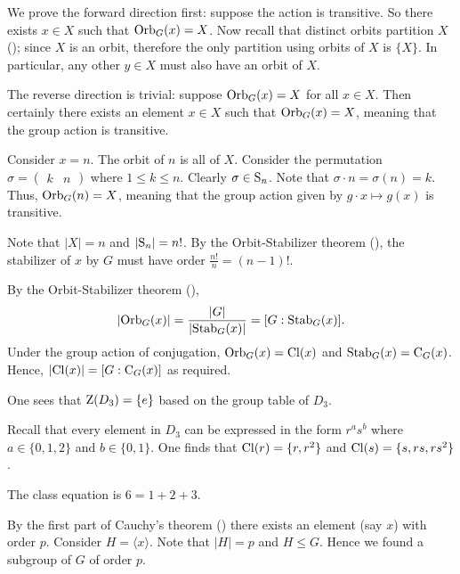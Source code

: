 \begin{questions}
    \item We prove the forward direction first: suppose the action is transitive. So there exists $x \in X$ such that $\mathrm{Orb}_{G}(x) = X$. Now recall that distinct orbits partition $X$ (); since $X$ is an orbit, therefore the only partition using orbits of $X$ is $\{X\}$. In particular, any other $y \in X$ must also have an orbit of $X$.

    The reverse direction is trivial: suppose $\mathrm{Orb}_{G}(x) = X$ for all $x \in X$. Then certainly there exists an element $x \in X$ such that $\mathrm{Orb}_{G}(x) = X$, meaning that the group action is transitive.

    \item \begin{partquestions}{\alph*}
        \item Consider $x = n$. The orbit of $n$ is all of $X$. Consider the permutation $\sigma = \begin{pmatrix}k & n\end{pmatrix}$ where $1 \leq k \leq n$. Clearly $\sigma \in \mathrm{S}_{n}$. Note that $\sigma \cdot n = \sigma(n) = k$. Thus, $\mathrm{Orb}_{G}(n) = X$, meaning that the group action given by $g \cdot x \mapsto g(x)$ is transitive.
        
        \item Note that $|X| = n$ and $|\mathrm{S}_{n}| = n!$. By the Orbit-Stabilizer theorem (), the stabilizer of $x$ by $G$ must have order $\frac{n!}{n} = (n-1)!$.
    \end{partquestions}

    \item By the Orbit-Stabilizer theorem (),
    \[
        |\mathrm{Orb}_{G}(x)| = \frac{|G|}{|\mathrm{Stab}_{G}(x)|} = [G : \mathrm{Stab}_{G}(x)].
    \]
    Under the group action of conjugation, $\mathrm{Orb}_{G}(x) = \mathrm{Cl}(x)$ and $\mathrm{Stab}_{G}(x) = \mathrm{C}_{G}(x)$. Hence, $|\mathrm{Cl}(x)| = [G : \mathrm{C}_{G}(x)]$ as required.

    \item \begin{partquestions}{\alph*}
        \item One sees that $\mathrm{Z}(D_3) = \{e\}$ based on the group table of $D_3$.
        \item Recall that every element in $D_3$ can be expressed in the form $r^as^b$ where $a \in \{0, 1, 2\}$ and $b \in \{0, 1\}$. One finds that $\mathrm{Cl}(r) = \{r, r^2\}$ and $\mathrm{Cl}(s) = \{s, rs, rs^2\}$.
        \item The class equation is $6 = 1 + 2 + 3$.
    \end{partquestions}

    \item By the first part of Cauchy's theorem () there exists an element (say $x$) with order $p$. Consider $H = \langle x \rangle$. Note that $|H| = p$ and $H \leq G$. Hence we found a subgroup of $G$ of order $p$.
\end{questions}

